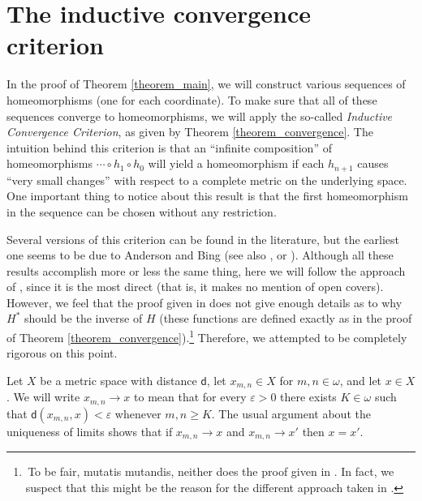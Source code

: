 \documentclass{amsart}
\theoremstyle{plain}
\theoremstyle{definition}
\newcommand{\di}{\mathsf{d}}
\begin{document}
\section{The inductive convergence criterion}\label{section_convergence}

In the proof of Theorem \ref{theorem_main}, we will construct various sequences of homeomorphisms (one for each coordinate). To make sure that all of these sequences converge to homeomorphisms, we will apply the so-called \emph{Inductive Convergence Criterion}, as given by Theorem \ref{theorem_convergence}. The intuition behind this criterion is that an ``infinite composition'' of homeomorphisms $\cdots\circ h_1\circ h_0$ will yield a homeomorphism if each $h_{n+1}$ causes ``very small changes'' with respect to a complete metric on the underlying space. One important thing to notice about this result is that the first homeomorphism in the sequence can be chosen without any restriction.

Several versions of this criterion can be found in the literature, but the earliest one seems to be due to Anderson and Bing \cite[Theorem 4.2]{anderson_bing} (see also \cite[Lemma 5.1]{anderson_curtis_van_mill}, or \cite[Exercise 1.6.1 and its solution on pages 533-534]{van_mill_book}). Although all these results accomplish more or less the same thing, here we will follow the approach of \cite[page 195]{yang}, since it is the most direct (that is, it makes no mention of open covers). However, we feel that the proof given in \cite{yang} does not give enough details as to why $H^\ast$ should be the inverse of $H$ (these functions are defined exactly as in the proof of Theorem \ref{theorem_convergence}).\footnote{\,To be fair, mutatis mutandis, neither does the proof given in \cite{anderson_bing}. In fact, we suspect that this might be the reason for the different approach taken in \cite{anderson_curtis_van_mill}.} Therefore, we attempted to be completely rigorous on this point.

Let $X$ be a metric space with distance $\di$, let $x_{m,n}\in X$ for $m,n\in\omega$, and let $x\in X$. We will write $x_{m,n}\to x$ to mean that for every $\varepsilon >0$ there exists $K\in\omega$ such that $\di(x_{m,n},x)<\varepsilon$ whenever $m,n\geq K$. The usual argument about the uniqueness of limits shows that if $x_{m,n}\to x$ and $x_{m,n}\to x'$ then $x=x'$.
\end{document}
